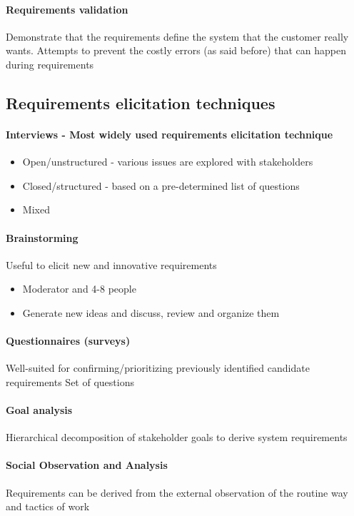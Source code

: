 \documentclass[../ESOF_notes.tex]{subfiles}
\begin{document}
\paragraph{Requirements validation}

Demonstrate that the requirements define the system that the customer really wants. Attempts to prevent the costly errors (as said before) that can happen during requirements

\subsection{Requirements elicitation techniques}

\paragraph{Interviews - Most widely used requirements elicitation technique}
\begin{itemize}
    \item Open/unstructured - various issues are explored with stakeholders
    \item Closed/structured - based on a pre-determined list of questions
    \item Mixed
\end{itemize}

\paragraph{Brainstorming}
Useful to elicit new and innovative requirements
\begin{itemize}
    \item Moderator and 4-8 people
    \item Generate new ideas and discuss, review and organize them
\end{itemize}


\paragraph{Questionnaires (surveys)}
Well-suited for confirming/prioritizing previously identified candidate requirements
Set of questions

\paragraph{Goal analysis} 
Hierarchical decomposition of stakeholder goals to derive system requirements

\paragraph{Social Observation and Analysis} 
Requirements can be derived from the external observation of the routine way and tactics of work
\end{document}
